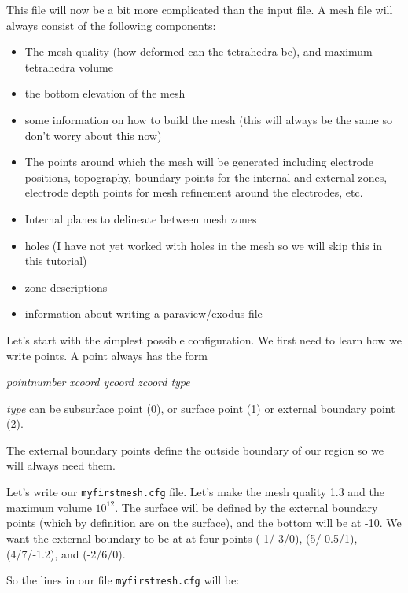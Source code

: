 \documentclass[11pt]{article}
\begin{document}
This file will now be a bit more complicated than the input file.
A mesh file will always consist of the following components:
\begin{itemize}
\item The mesh quality (how deformed can the tetrahedra be), and
  maximum tetrahedra volume
\item the bottom elevation of the mesh
\item some information on how to build the mesh (this will always be
  the same so don't worry about this now)
\item The points around which the mesh will be generated including
  electrode positions, topography, boundary points for the internal
  and external zones, electrode depth points for mesh refinement
  around the electrodes, etc.
\item Internal planes to delineate between mesh zones
\item holes (I have not yet worked with holes in the mesh so we will
  skip this in this tutorial)
\item zone descriptions
\item information about writing a paraview/exodus file
\end{itemize}

Let's start with the simplest possible configuration. We first need to
learn how we write points. A point always has the form

\emph{pointnumber xcoord ycoord zcoord type}

\emph{type} can be subsurface point (0), or surface point (1) or
external boundary point (2).

The external boundary points define the outside boundary of our region
so we will always need them.

Let's write our \verb+myfirstmesh.cfg+ file. Let's make the mesh
quality 1.3 and the maximum volume $10^{12}$. The surface will be
defined by the external boundary points (which by definition are on
the surface), and the bottom will be at -10. We want the external
boundary to be at at four points (-1/-3/0), (5/-0.5/1), (4/7/-1.2),
and (-2/6/0).

\newpage
So the lines in our file \verb+myfirstmesh.cfg+ will be:
\end{document}
